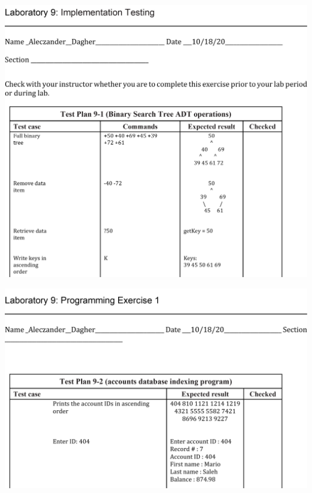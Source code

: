 \begin{DoxyImageNoCaption}
  \mbox{\includegraphics[width=17cm]{Lab9Sheet2.png}}
\end{DoxyImageNoCaption}



\begin{DoxyImageNoCaption}
  \mbox{\includegraphics[width=17cm]{Lab9Sheet3.png}}
\end{DoxyImageNoCaption}



